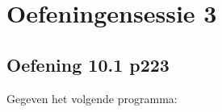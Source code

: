 \chapter{Oefeningensessie 3}


\section{Oefening 10.1 p223}

Gegeven het volgende programma:
\begin{lstlisting}

\end{lstlisting}